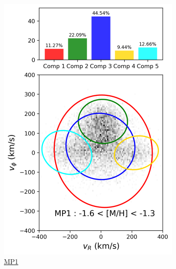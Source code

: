 \documentclass[a4paper,12pt]{article}
\begin{document}
\begin{figure}[h]
\begin{subfigure}[t]{0.24\textwidth}
        \includegraphics[width=\linewidth]{../figures/gmm_MP1.png}
        \caption{\href{https://raw.githack.com/raunaq-rai/Disentangling-the-Milky-Way-using-GMM/main/figures/MP1\_\_-1.6\%5BM\_H\%5D-1.3.html}{MP1}}
        \label{fig:gmm_mp1}
    \end{subfigure}\hfill
    \begin{subfigure}[t]{0.24\textwidth}
        \centering

\end{subfigure}
\end{figure}
\end{document}
